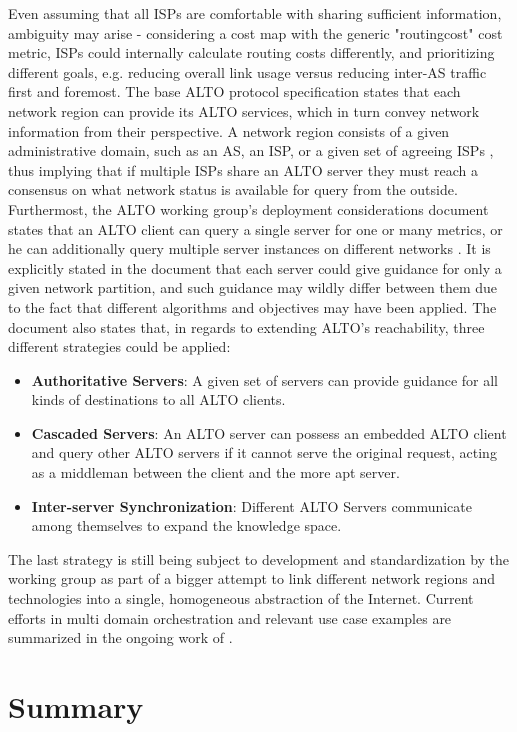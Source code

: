     Even assuming that all ISPs are comfortable with sharing sufficient information, ambiguity may arise - considering a cost map with the generic "routingcost" cost metric, ISPs could internally calculate routing costs differently, and prioritizing different goals, e.g. reducing overall link usage versus reducing inter-AS traffic first and foremost.
    The base ALTO protocol specification states that each network region can provide its ALTO services, which in turn convey network information from their perspective.
    A network region consists of a given administrative domain, such as an AS, an ISP, or a given set of agreeing ISPs \cite{alto-protocol}, thus implying that if multiple ISPs share an ALTO server they must reach a consensus on what network status is available for query from the outside.
    Furthermost, the ALTO working group's deployment considerations \cite{alto-deployment-considerations} document states that an ALTO client can query a single server for one or many metrics, or he can additionally query multiple server instances on different networks \cite{alto-deployment-considerations}.
    It is explicitly stated in the document that each server could give guidance for only a given network partition, and such guidance may wildly differ between them due to the fact that different algorithms and objectives may have been applied.
    The document also states that, in regards to extending ALTO's reachability, three different strategies could be applied:

\begin{itemize}
    \item \textbf{Authoritative Servers}: A given set of servers can provide guidance for all kinds of destinations to all ALTO clients.
    \item \textbf{Cascaded Servers}: An ALTO server can possess an embedded ALTO client and query other ALTO servers if it cannot serve the original request, acting as a middleman between the client and the more apt server.
    \item \textbf{Inter-server Synchronization}: Different ALTO Servers communicate among themselves to expand the knowledge space.
\end{itemize}

    The last strategy is still being subject to development and standardization by the working group as part of a bigger attempt to link different network regions and technologies into a single, homogeneous abstraction of the Internet.
    Current efforts in multi domain orchestration and relevant use case examples are summarized in the ongoing work of \cite{ALTO-multi-domain-use-cases(draft)}.

\section{Summary}

